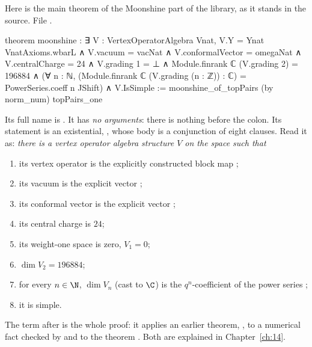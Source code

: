 Here is the main theorem of the Moonshine part of the library, as it stands in the source.
\noindent File .
\begin{leancode}
theorem moonshine :
    ∃ V : VertexOperatorAlgebra Vnat,
      V.Y = Ynat VnatAxioms.wbarL ∧ V.vacuum = vacNat ∧ V.conformalVector = omegaNat ∧
      V.centralCharge = 24 ∧
      V.grading 1 = ⊥ ∧
      Module.finrank ℂ (V.grading 2) = 196884 ∧
      (∀ n : ℕ, (Module.finrank ℂ (V.grading (n : ℤ)) : ℂ) = PowerSeries.coeff n JShift) ∧
      V.IsSimple :=
  moonshine_of_topPairs (by norm_num) topPairs_one
\end{leancode}
Its full name is . It has \emph{no arguments}: there is nothing
before the colon. Its statement is an existential, ,
whose body is a conjunction of eight clauses. Read it as: \emph{there is a vertex operator algebra
structure $V$ on the space  such that}
\begin{enumerate}[label=(\arabic*)]
\item its vertex operator is the explicitly constructed block map ;
\item its vacuum is the explicit vector ;
\item its conformal vector is the explicit vector ;
\item its central charge is $24$;
\item its weight-one space is zero, $V_1 = 0$;
\item $\dim V_2 = 196884$;
\item for every $n\in\N$, $\dim V_n$ (cast to $\C$) is the $q^n$-coefficient of the power series
  ;
\item it is simple.
\end{enumerate}
The term after \lean{:=} is the whole proof: it applies an earlier theorem,
, to a numerical fact checked by  and to the theorem
. Both are explained in Chapter~\ref{ch:14}.
